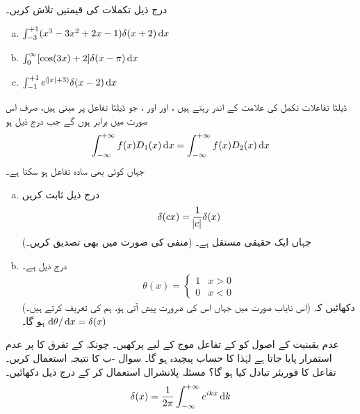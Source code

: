 درج ذیل تکملات کی قیمتیں تلاش کریں۔ 
\begin{enumerate}[a.]
\item\(\int_{-3}^{+1}(x^{3}-3x^{2}+2x-1) \delta(x+2) \dif{x}\)
\item\( \int_{0}^{\infty}[\cos(3x)+2] \delta(x-\pi) \dif{x}\)
\item\(\int_{-1}^{+1}e^{(\abs x+3)} \delta (x-2) \dif{x}\)
\end{enumerate}
 ڈیلٹا تفاعلات  تکمل کی علامت کے اندر  رہتے ہیں ، اور   اور  ، جو ڈیلٹا تفاعل پر مبنی ہیں،  صرف اس  صورت میں برابر ہوں گے جب  درج ذیل ہو
\begin{align*}
\int_{-\infty}^{+\infty}f(x) D_1(x) \dif x =\int_{-\infty}^{+\infty}f(x) D_2(x) \dif x
\end{align*}
 جہاں  کوئی بھی سادہ تفاعل ہو سکتا ہے۔
\begin{enumerate}[a.]
\item 
درج ذیل  ثابت کریں
 \begin{align}\delta(cx)=\frac{1}{\abs{c}}\delta(x)\end{align}
جہاں  ایک حقیقی مستقل ہے۔ (منفی  کی صورت میں بھی تصدیق کریں۔) 
\item 
{}  درج ذیل ہے۔
\begin{align}\label{مساوات_غیر_تابع_شروڈنگر_تھیٹا_سیڑھی_تفاعل}
\theta(x)=
\begin{cases}
1& x>0\\
0& x<0
\end{cases}
\end{align}
 (اس نایاب صورت میں جہاں اس کی ضرورت پیش آتی ہو، ہم  کی 
تعریف  کرتے ہیں۔)  دکھائیں کہ \(\dif{\theta}/\dif{x}=\delta(x)\)  ہو گا۔
\end{enumerate}
 عدم یقینیت کے اصول کو  کے تفاعل موج کے لیے پرکھیں۔   چونکہ  کے تفرق کا   پر عدم استمرار پایا جاتا ہے لہٰذا کا حساب پیچیدہ ہو گا۔ سوال -ب کا نتیجہ استعمال کریں۔   
 تفاعل  کا فوریئر تبادل کیا ہو گا؟ مسئلہ پلانشرال استعمال کر کے درج ذیل دکھائیں۔ 
\begin{align}\label{مساوات_شروڈنگر_ڈیلٹا_پلانشرال}
\delta(x)=\frac{1}{2\pi}\int_{-\infty}^{+\infty} e^{ikx} \dif{k}
\end{align}
